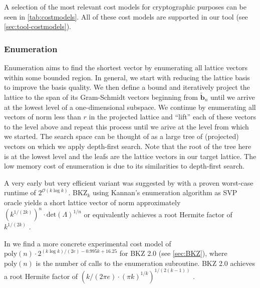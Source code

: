 A selection of the most relevant cost models for cryptographic purposes can be seen in \cref{tab:costmodels}. All of these cost models are supported in our tool (see \cref{sec:tool-costmodels}).


\subsubsection{Enumeration} \label{sec:enumeration}%
Enumeration aims to find the shortest vector by enumerating all lattice vectors within some bounded region. In general, we start with reducing the lattice basis to improve the basis quality. We then define a bound and iteratively project the lattice to the span of its Gram-Schmidt vectors beginning from $\tilde{\mathbf{b}}_n$ until we arrive at the lowest level of a one-dimensional subspace. We continue by enumerating all vectors of norm less than $r$ in the projected lattice and ``lift'' each of these vectors to the level above and repeat this process until we arive at the level from which we started. The search space can be thought of as a large tree of (projected) vectors on which we apply depth-first search. Note that the root of the tree here is at the lowest level and the leafs are the lattice vectors in our target lattice. %
The low memory cost of enumeration is due to its similarities to depth-first search.

A very early but very efficient variant was suggested by \citet{Kan83} with a proven worst-case runtime of $2^{\mathcal{O}(k \log k)}$. BKZ$_k$ using Kannan's enumeration algorithm as SVP oracle yields a short lattice vector of norm approximately $\left(k^{1/(2k)}\right)^n\cdot \text{det}(\Lambda)^{1/n}$ or equivalently achieves a root Hermite factor of $k^{1/(2k)}$ \cite{HS07, ABFKSW20}. %

In \cite{ABFKSW20} we find a more concrete experimental cost model of $\text{poly}(n) \cdot 2^{(k \log k) / (2e)  - 0.995 k + 16.25}$ for BKZ 2.0 (see \cref{sec:BKZ}), where $\text{poly}(n)$ is the number of calls to the enumeration subroutine. BKZ 2.0 achieves a  root Hermite factor of $\left(k / (2\pi e) \cdot (\pi k)^{1/k}\right)^{1 / (2(k-1))}$ \cite{Chen13}.


